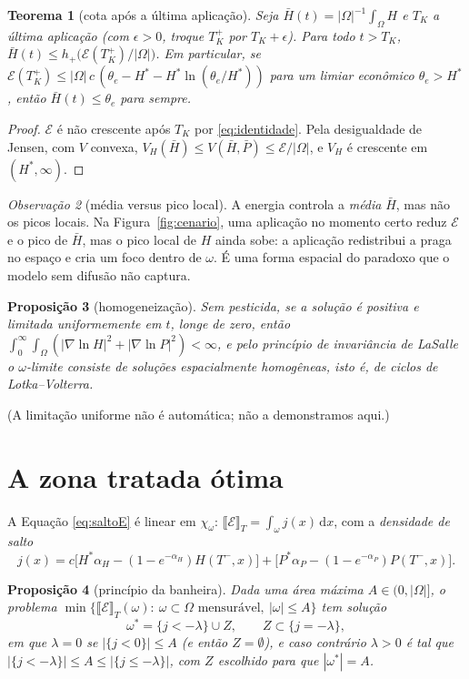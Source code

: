 \documentclass[11pt,a4paper]{article}
\numberwithin{equation}{section}
\newtheorem{teorema}{Teorema}[section]
\newtheorem{proposicao}[teorema]{Proposição}
\theoremstyle{definition}
\theoremstyle{remark}
\newtheorem{observacao}[teorema]{Observação}
\newcommand{\E}{\mathcal{E}}
\newcommand{\jump}[1]{\llbracket #1 \rrbracket}
\newcommand{\dd}{\,\mathrm{d}}
\newcommand{\Hs}{H^{*}}
\newcommand{\Ps}{P^{*}}
\begin{document}
\begin{teorema}[cota após a última aplicação]\label{teo:cota}
Seja $\bar H(t)=|\Omega|^{-1}\int_\Omega H$ e $T_K$ a última aplicação (com $\epsilon>0$, troque $T_K^+$
por $T_K+\epsilon$). Para todo $t>T_K$, $\bar H(t)\le h_+\big(\E(T_K^+)/|\Omega|\big)$. Em particular, se
$\E(T_K^+)\le|\Omega|\,c\,(\theta_e-\Hs-\Hs\ln(\theta_e/\Hs))$ para um limiar econômico $\theta_e>\Hs$,
então $\bar H(t)\le\theta_e$ para sempre.
\end{teorema}

\begin{proof}
$\E$ é não crescente após $T_K$ por \eqref{eq:identidade}. Pela desigualdade de Jensen, com $V$
convexa, $V_H(\bar H)\le V(\bar H,\bar P)\le\E/|\Omega|$, e $V_H$ é crescente em $(\Hs,\infty)$.
\end{proof}

\begin{observacao}[média versus pico local]\label{obs:pico}
A energia controla a \emph{média} $\bar H$, mas não os picos locais. Na Figura~\ref{fig:cenario},
uma aplicação no momento certo reduz $\E$ e o pico de $\bar H$, mas o pico local de $H$ ainda sobe:
a aplicação redistribui a praga no espaço e cria um foco dentro de $\omega$. É uma forma
espacial do paradoxo que o modelo sem difusão não captura.
\end{observacao}

\begin{proposicao}[homogeneização]
Sem pesticida, se a solução é positiva e limitada uniformemente em $t$, longe de zero, então
$\int_0^\infty\!\!\int_\Omega(|\nabla\ln H|^2+|\nabla\ln P|^2)<\infty$, e pelo princípio de invariância de
LaSalle \cite{Hale} o $\omega$-limite consiste de soluções espacialmente homogêneas, isto é, de ciclos
de Lotka--Volterra.
\end{proposicao}
\noindent(A limitação uniforme não é automática; não a demonstramos aqui.)

\section{A zona tratada ótima}

A Equação \eqref{eq:saltoE} é linear em $\chi_\omega$:
$\jump{\E}_T=\int_\omega j(x)\dd x$, com a \emph{densidade de salto}
\[
j(x)=c\big[\Hs\alpha_H-(1-e^{-\alpha_H})H(T^-,x)\big]+\big[\Ps\alpha_P-(1-e^{-\alpha_P})P(T^-,x)\big].
\]

\begin{proposicao}[princípio da banheira]\label{prop:banheira}
Dada uma área máxima $A\in(0,|\Omega|]$, o problema
$\min\{\jump{\E}_T(\omega):\ \omega\subset\Omega \text{ mensurável},\ |\omega|\le A\}$ tem solução
\[
\omega^*=\{j<-\lambda\}\cup Z,\qquad Z\subset\{j=-\lambda\},
\]
em que $\lambda=0$ se $|\{j<0\}|\le A$ (e então $Z=\emptyset$), e caso contrário $\lambda>0$ é tal que
$|\{j<-\lambda\}|\le A\le|\{j\le-\lambda\}|$, com $Z$ escolhido para que $|\omega^*|=A$.
\end{proposicao}
\end{document}
